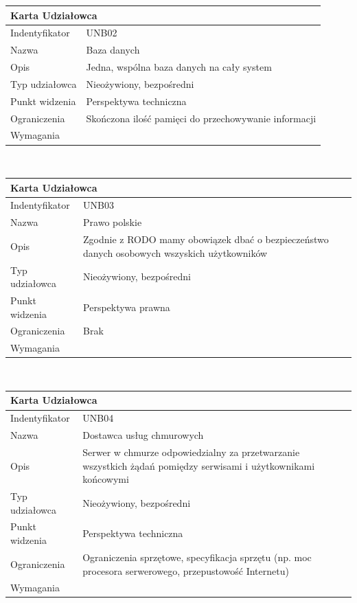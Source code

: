 \documentclass[a4paper,11pt]{report}
\begin{document}
	\begin{tabular}{|p{3cm}|p{11cm}|}
	\hline
	\multicolumn{2}{|l|}{\textbf{Karta Udziałowca}}\\
	\hline
	Indentyfikator&UNB02\\
	\hline
	Nazwa&Baza danych\\
	\hline
	Opis&Jedna, wspólna baza danych na cały system\\
	\hline
	Typ udziałowca&Nieożywiony, bezpośredni\\
	\hline
	Punkt widzenia&Perspektywa techniczna\\
	\hline
	Ograniczenia&Skończona ilość pamięci do przechowywanie informacji\\
	\hline
	Wymagania&\\
	\hline
	\end{tabular}\\
	\begin{tabular}{|p{3cm}|p{11cm}|}
	\hline
	\multicolumn{2}{|l|}{\textbf{Karta Udziałowca}}\\
	\hline
	Indentyfikator&UNB03\\
	\hline
	Nazwa&Prawo polskie\\
	\hline
	Opis&Zgodnie z RODO mamy obowiązek dbać o bezpieczeństwo danych osobowych wszyskich użytkowników\\
	\hline
	Typ udziałowca&Nieożywiony, bezpośredni\\
	\hline
	Punkt widzenia&Perspektywa prawna\\
	\hline
	Ograniczenia&Brak\\
	\hline
	Wymagania&\\
	\hline
	\end{tabular}\\
	\begin{tabular}{|p{3cm}|p{11cm}|}
	\hline
	\multicolumn{2}{|l|}{\textbf{Karta Udziałowca}}\\
	\hline
	Indentyfikator&UNB04\\
	\hline
	Nazwa&Dostawca usług chmurowych\\
	\hline
	Opis&Serwer w chmurze odpowiedzialny za przetwarzanie wszystkich żądań pomiędzy serwisami i użytkownikami końcowymi\\
	\hline
	Typ udziałowca&Nieożywiony, bezpośredni\\
	\hline
	Punkt widzenia&Perspektywa techniczna\\
	\hline
	Ograniczenia&Ograniczenia sprzętowe, specyfikacja sprzętu (np. moc procesora serwerowego, przepustowość Internetu)\\
	\hline
	Wymagania&\\
	\hline
	\end{tabular}\\
\end{document}
